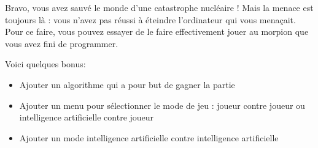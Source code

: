 \documentclass[a4paper]{article}
\begin{document}
\newpage

\begin{flushleft}


\vspace*{1cm}

\setlength{\parindent}{3ex}Bravo, vous avez sauvé le monde d’une catastrophe nucléaire ! Mais la menace est toujours là : vous n’avez pas réussi à éteindre l’ordinateur qui vous menaçait. Pour ce faire, vous pouvez essayer de le faire effectivement jouer au morpion que vous avez fini de programmer.

Voici quelques bonus:
\begin{itemize}[label=\textbullet,font=\color{black}] 
\item Ajouter un algorithme qui a pour but de gagner la partie

\item Ajouter un menu pour sélectionner le mode de jeu : joueur contre joueur ou intelligence artificielle contre joueur

\item Ajouter un mode intelligence artificielle contre intelligence artificielle
\end{itemize}
\end{flushleft}
\end{document}
